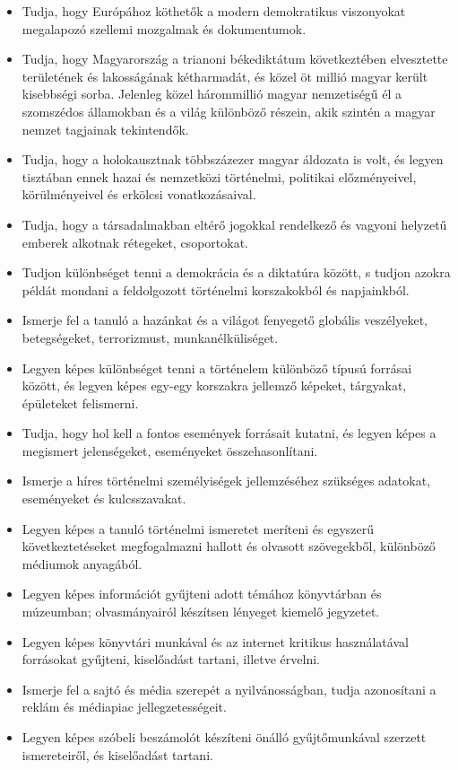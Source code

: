 \begin{itemize}
\item Tudja, hogy Európához köthetők a modern demokratikus viszonyokat megalapozó szellemi mozgalmak és dokumentumok.
\item Tudja, hogy Magyarország a trianoni békediktátum következtében elvesztette területének és lakosságának kétharmadát, és közel öt millió magyar került kisebbségi sorba. Jelenleg közel hárommillió magyar nemzetiségű él a szomszédos államokban és a világ különböző részein, akik szintén a magyar nemzet tagjainak tekintendők.
\item Tudja, hogy a holokausztnak többszázezer magyar áldozata is volt, és legyen tisztában ennek hazai és nemzetközi történelmi, politikai előzményeivel, körülményeivel és erkölcsi vonatkozásaival.
\item Tudja, hogy a társadalmakban eltérő jogokkal rendelkező és vagyoni helyzetű emberek alkotnak rétegeket, csoportokat.
\item Tudjon különbséget tenni a demokrácia és a diktatúra között, s tudjon azokra példát mondani a feldolgozott történelmi korszakokból és napjainkból.
\item Ismerje fel a tanuló a hazánkat és a világot fenyegető globális veszélyeket, betegségeket, terrorizmust, munkanélküliséget.
\item Legyen képes különbséget tenni a történelem különböző típusú forrásai között, és legyen képes egy-egy korszakra jellemző képeket, tárgyakat, épületeket felismerni.
\item Tudja, hogy hol kell a fontos események forrásait kutatni, és legyen képes a megismert jelenségeket, eseményeket összehasonlítani.
\item Ismerje a híres történelmi személyiségek jellemzéséhez szükséges adatokat, eseményeket és kulcsszavakat.
\item Legyen képes a tanuló történelmi ismeretet meríteni és egyszerű következtetéseket megfogalmazni hallott és olvasott szövegekből, különböző médiumok anyagából.
\item Legyen képes információt gyűjteni adott témához könyvtárban és múzeumban; olvasmányairól készítsen lényeget kiemelő jegyzetet.
\item Legyen képes könyvtári munkával és az internet kritikus használatával forrásokat gyűjteni, kiselőadást tartani, illetve érvelni.
\item Ismerje fel a sajtó és média szerepét a nyilvánosságban, tudja azonosítani a reklám és médiapiac jellegzetességeit.
\item Legyen képes szóbeli beszámolót készíteni önálló gyűjtőmunkával szerzett ismereteiről, és kiselőadást tartani.

\end{itemize}
